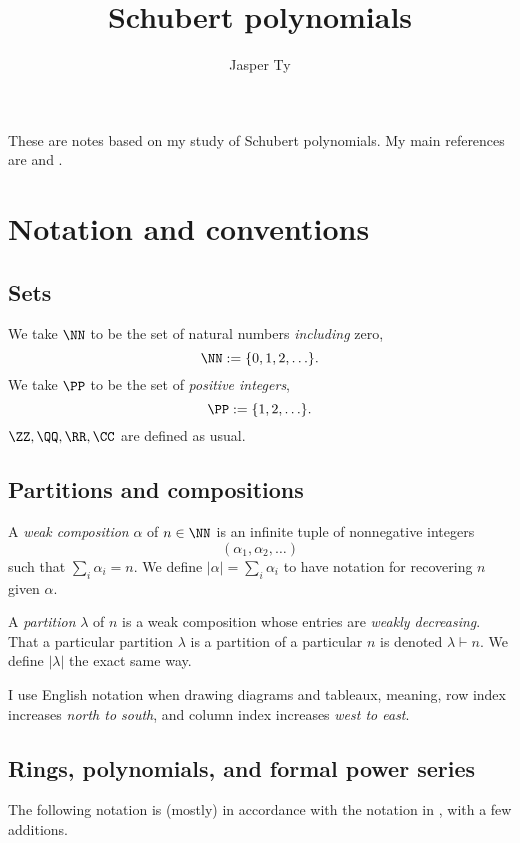 \documentclass{article}
\title{Schubert polynomials}
\author{Jasper Ty}
\date{}
\begin{document}
\maketitle

These are notes based on my study of Schubert polynomials. My main references are \cite{KnutsonSchubertPolynomials} and \cite{MacdonaldSchubertPolynomials}.

\tableofcontents

\section{Notation and conventions}

\subsection{Sets}

We take $\NN$ to be the set of natural numbers \textit{including} zero,
\[
    \NN := \{0,1,2,\ldots\}.
\]
We take $\PP$ to be the set of \textit{positive integers},
\[
    \PP := \{1,2,\ldots\}.
\]
$\ZZ,\QQ,\RR,\CC$ are defined as usual.

\subsection{Partitions and compositions}

A \textit{weak composition} $\alpha$ of $n \in \NN$ is an infinite tuple of nonnegative integers 
\[
    (\alpha_1, \alpha_2, \ldots)
\]
such that $\sum_i \alpha_i = n$. 
We define $|\alpha| = \sum_i \alpha_i$ to have notation for recovering $n$ given $\alpha$.

A \textit{partition} $\lambda$ of $n$ is a weak composition whose entries are \textit{weakly decreasing}. 
That a particular partition $\lambda$ is a partition of a particular $n$ is denoted $\lambda \vdash n$. 
We define $|\lambda|$ the exact same way.

I use English notation when drawing diagrams and tableaux, meaning, row index increases \textit{north to south}, and column index increases \textit{west to east}.

\subsection{Rings, polynomials, and formal power series}

The following notation is (mostly) in accordance with the notation in \cite{DarijAC}, with a few additions. 
\end{document}

